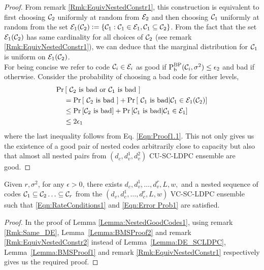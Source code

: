 \begin{proof}
 From remark \ref{Rmk:EquivNestedConstr1}, this construction is equivalent to first choosing $\mathcal{C}_{2}$ uniformly at random from $\mathcal{E}_{2}$ and then choosing $\mathcal{C}_{1}$ uniformly at random from the set $\mathcal{E}_{1}(\mathcal{C}_{2})\mathrel{\mathop:}= \{\mathcal{C}_{1}:\mathcal{C}_{1}\in \mathcal{E}_{1},\mathcal{C}_{1}\subseteq \mathcal{C}_{2}\}$. From the fact that the set $\mathcal{E}_{1}(\mathcal{C}_{2})$ has same cardinality for all choices of $\mathcal{C}_{2}$ (see remark \ref{Rmk:EquivNestedConstr1}), we can deduce that the marginal distribution for $\mathcal{C}_{1}$ is uniform on $\mathcal{E}_{1}(\mathcal{C}_{2})$.\\
 For being concise we refer to code $\mathcal{C}_{i}\in\mathcal{E}_{i}$ as good if $\text{P}_{\text{b}}^{\text{BP}}(\mathcal{C}_{i},\sigma^{2})\leq \epsilon_{2}$ and bad if otherwise. Consider the probability of choosing a bad code for either levels,
 \begin{align*}
\text{Pr}&\left[~ \mathcal{C}_{2}  \text{ is bad  or } \mathcal{C}_{1} \text{ is bad }\right] \\
&=\text{Pr}\left[~\mathcal{C}_{2} \text{ is bad } \right] +\text{Pr}\left[~\mathcal{C}_{1} \text{ is bad} \middle\vert \mathcal{C}_{1} \in \mathcal{E}_{1}(\mathcal{C}_{2}) \right] \\
&\leq \text{Pr}\left[\mathcal{C}_{2} \text{ is bad} \right] +\text{Pr}\left[\mathcal{C}_{1} \text{ is bad}\middle\vert \mathcal{C}_{1} \in \mathcal{E}_{1}\right] \\
&\leq 2\epsilon_{1}
 \end{align*}
 where the last inequality follows from%
 Eq. \eqref{Eqn:Proof1.1}. This not only gives us the existence of a good pair of nested codes arbitrarily close to capacity but also that almost all nested pairs from $(d_{c},d_{v}^{1},d_{v}^{2})$ CU-SC-LDPC ensemble are good.
\end{proof}

\begin{lemma}\label{Lemma:NestedGoodCodes2}
Given $r,\sigma^{2}$, for any $\epsilon>0$, there exists $d_{c},d_{v}^{1},\ldots, d_{v}^{r},L,w,$ and a nested sequence of codes $\mathcal{C}_{1}\subseteq \mathcal{C}_{2}\ldots \subseteq\mathcal{C}_{r}$ from the $(d_{v},d_{c}^{1},\ldots,d_{c}^{r},L,w)$ VC-SC-LDPC ensemble such that \eqref{Eqn:RateConditions1} and \eqref{Eqn:Error Prob1} are satisfied.
\end{lemma}
	\begin{proof}
In the proof of Lemma \ref{Lemma:NestedGoodCodes1}, using remark \ref{Rmk:Same_DE}, Lemma~\ref{Lemma:BMSProof2} and remark \ref{Rmk:EquivNestedConstr2}  instead of  Lemma~\ref{Lemma:DE_SCLDPC}, Lemma~\ref{Lemma:BMSProof1} and remark \ref{Rmk:EquivNestedConstr1} respectively gives us the required proof.	
\end{proof}

